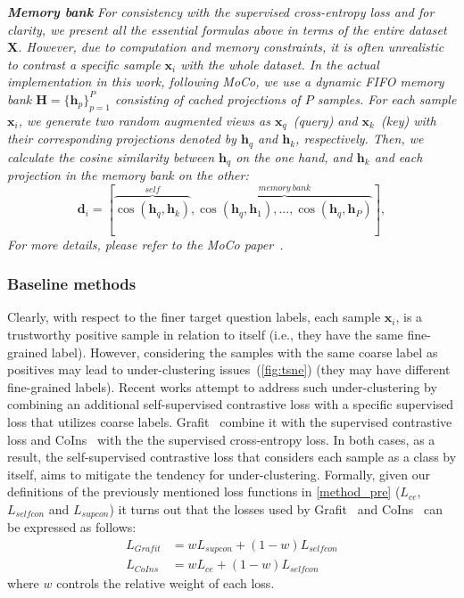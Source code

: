\documentclass[10pt,twocolumn,letterpaper]{article}
\def\vd{{\bm{d}}}
\def\vh{{\bm{h}}}
\def\vx{{\bm{x}}}
\def\mH{{\bm{H}}}
\def\mX{{\bm{X}}}
\begin{document}
\begin{mdframed}[linecolor=lightgray!20,backgroundcolor=lightgray!20,everyline=true,linewidth=2pt,roundcorner=0pt,innertopmargin=0pt,
    innerbottommargin=0pt,
    innerrightmargin=0pt,
    innerleftmargin=0pt,
        leftmargin = 0pt,
        rightmargin = 0pt
        ]\textit{\textbf{Memory bank} For consistency with the supervised cross-entropy loss and for clarity, we present all the essential formulas above in terms of the entire dataset $\mX$. However, due to computation and memory constraints, it is often unrealistic to contrast a specific sample $\vx_i$ with the whole dataset.  In the actual implementation in this work, following MoCo\cite{moco}, we use a dynamic \textit{FIFO} memory bank $\mH = \{\vh_p\}_{p=1}^P$ consisting of cached projections of $P$ samples. For each sample $\vx_i$, we generate two random augmented views as $\vx_q$~(query) and $\vx_k$~(key) with their corresponding projections denoted by $\vh_q$ and $\vh_k$, respectively. Then, we calculate the cosine similarity between $\vh_q$ on the one hand, and $\vh_k$ and each projection in the memory bank on the other: 
\begin{equation}\label{eq:mocosim}
    \vd_i = [\overbrace{\cos(\vh_q, \vh_k)}^{self}, \overbrace{\cos(\vh_q, \vh_1),..., \cos(\vh_q, \vh_P)}^{memory \ bank}],
\end{equation}
For more details, please refer to the MoCo paper~\cite{moco}.}
\end{mdframed}

\subsubsection{Baseline methods}
Clearly, with respect to the finer target question labels, each sample $\vx_i$, is a trustworthy positive sample in relation to itself (i.e., they have the same fine-grained label). However, considering the samples with the same coarse label as positives may lead to under-clustering issues~(\cref{fig:tsne}) (they may have different fine-grained labels). 
Recent works attempt to address such under-clustering by combining an additional self-supervised contrastive loss with a specific supervised loss that utilizes coarse labels. Grafit~\cite{touvron2021grafit} combine it with the supervised contrastive loss and CoIns~\cite{xu2021coins} with the the supervised cross-entropy loss. 
In both cases, as a result, the self-supervised contrastive loss that considers each sample as a class by itself, aims to mitigate the tendency for under-clustering. 
Formally, given our definitions of the previously mentioned loss functions in \cref{method_pre} ($L_{ce}$, $L_{selfcon}$ and $L_{supcon}$) it turns out that the losses used by Grafit~\cite{touvron2021grafit} and CoIns~\cite{xu2021coins} can be expressed as follows: 
\begin{align}
    L_{Grafit} &= wL_{supcon} + (1-w)L_{selfcon} \\
    L_{CoIns} &= wL_{ce} + (1-w)L_{selfcon}
\end{align}
where $w$ controls the relative weight of each loss.
\end{document}
